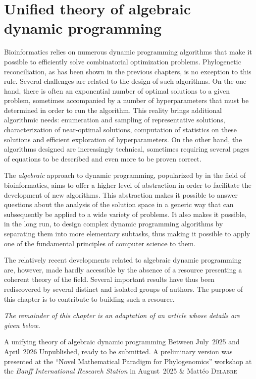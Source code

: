 \chapter{Unified theory of algebraic dynamic programming}\label{chap:adp}

Bioinformatics relies on numerous dynamic programming algorithms that make it possible to efficiently solve combinatorial optimization problems.
Phylogenetic reconciliation, as has been shown in the previous chapters, is no exception to this rule.
Several challenges are related to the design of such algorithms.
On the one hand, there is often an exponential number of optimal solutions to a given problem, sometimes accompanied by a number of hyperparameters that must be determined in order to run the algorithm.
This reality brings additional algorithmic needs: enumeration and sampling of representative solutions, characterization of near-optimal solutions, computation of statistics on these solutions and efficient exploration of hyperparameters.
On the other hand, the algorithms designed are increasingly technical, sometimes requiring several pages of equations to be described and even more to be proven correct.

The \emph{algebraic} approach to dynamic programming, popularized by
\textcite{Giegerich2004DisciplineDynamicProgramming} in the field of bioinformatics, aims to offer a higher level of abstraction in order to facilitate the development of new algorithms.
This abstraction makes it possible to answer questions about the analysis of the solution space in a generic way that can subsequently be applied to a wide variety of problems.
It also makes it possible, in the long run, to design complex dynamic programming algorithms by separating them into more elementary subtasks, thus making it possible to apply one of the fundamental principles of computer science to them.

The relatively recent developments related to algebraic dynamic programming are, however, made hardly accessible by the absence of a resource presenting a coherent theory of the field.
Several important results have thus been rediscovered by several distinct and isolated groups of authors.
The purpose of this chapter is to contribute to building such a resource.

\emph{The remainder of this chapter is an adaptation of an article whose details are given below.}

\articlemetasingle%
    {A unifying theory of algebraic dynamic programming}%
    {Between July~2025 and April~2026}%
    {Unpublished, ready to be submitted. A preliminary version was presented at the \enquote{Novel Mathematical Paradigm for Phylogenomics} workshop at the \emph{Banff International Research Station} in August~2025}%
    {& Mattéo \textsc{Delabre}}


